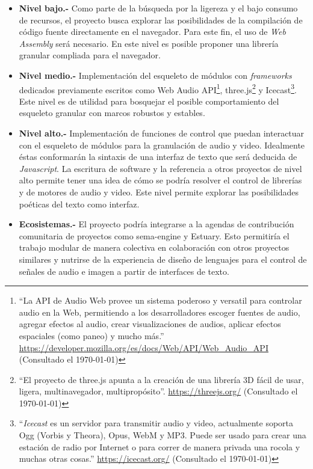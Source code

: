 \begin{itemize}


\item \textbf{Nivel bajo.-} Como parte de la búsqueda por la ligereza y el bajo consumo de recursos, el proyecto busca explorar las posibilidades de la compilación de código fuente directamente en el navegador. Para este fin, el uso de \textit{Web Assembly} será necesario. En este nivel es posible proponer una librería granular compliada para el navegador. 
\item \textbf{Nivel medio.-} Implementación del esqueleto de módulos con \textit{frameworks} dedicados previamente escritos como Web Audio API\footnote{``La API de Audio Web provee un sistema poderoso y versatil para controlar audio en la Web, permitiendo a los desarrolladores escoger fuentes de audio, agregar efectos al audio, crear visualizaciones de audios, aplicar efectos espaciales (como paneo) y mucho más.'' \url{https://developer.mozilla.org/es/docs/Web/API/Web_Audio_API} (Consultado el \today)}, three.js\footnote{``El proyecto de three.js apunta a la creación de una librería 3D fácil de usar, ligera, multinavegador, multipropósito''. \url{https://threejs.org/} (Consultado el \today)} y Icecast\footnote{``\textit{Icecast} es un servidor para transmitir audio y video, actualmente soporta Ogg (Vorbis y Theora), Opus, WebM y MP3. Puede ser usado para crear una estación de radio por Internet o para correr de manera privada una rocola y muchas otras cosas.'' \url{https://icecast.org/} (Consultado el \today)}. Este nivel es de utilidad para bosquejar el posible comportamiento del esqueleto granular con marcos robustos y estables. 
\item \textbf{Nivel alto.-} Implementación de funciones de control que puedan interactuar con el esqueleto de módulos para la granulación de audio y video. Idealmente éstas conformarán la sintaxis de una interfaz de texto que será deducida de \textit{Javascript}. La escritura de software y la referencia a otros proyectos de nivel alto permite tener una idea de cómo se podría resolver el control de librerías y de motores de audio y video. Este nivel permite explorar las posibilidades poéticas del texto como interfaz.
\item \textbf{Ecosistemas.-} El proyecto podría integrarse a la agendas de contribución comunitaria de proyectos como sema-engine \citep{2019_40} y Estuary. Esto permitiría el trabajo modular de manera colectiva en colaboración con otros proyectos similares y nutrirse de la experiencia de diseño de lenguajes para el control de señales de audio e imagen a partir de interfaces de texto. 
  
\end{itemize}

